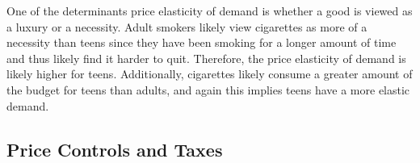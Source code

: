 \documentclass[addpoints,11pt]{exam}
\theoremstyle{definition}
\begin{document}
\begin{questions}
\begin{parts}
		\begin{solution}
			One of the determinants price elasticity of demand is whether a good is viewed as a luxury or a necessity. Adult smokers likely view cigarettes as more of a necessity than teens since they have been smoking for a longer amount of time and thus likely find it harder to quit. Therefore, the price elasticity of demand is likely higher for teens. Additionally, cigarettes likely consume a greater amount of the budget for teens than adults, and again this implies teens have a more elastic demand.
		\end{solution}
		
	\end{parts}

\end{questions}

\subsection*{Price Controls and Taxes}	
\end{document}
